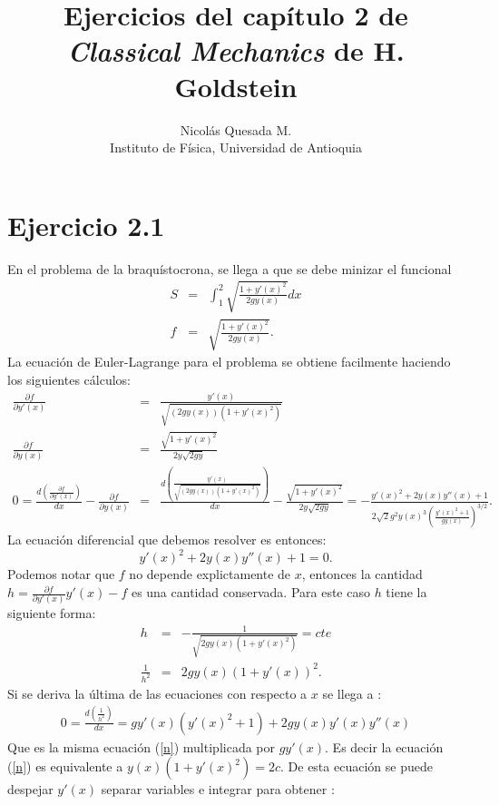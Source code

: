 \documentclass[letterpaper,10pt]{article}
\title{Ejercicios del cap\'itulo 2 de\\ \emph{Classical Mechanics} de H. Goldstein}
\author{Nicol\'as Quesada M. \\ {\small \sf Instituto de F\'isica, Universidad de Antioquia}}
\date{}
\begin{document}
\maketitle
\section*{Ejercicio 2.1}
En el problema de la braqu\'istocrona, se llega a que se debe minizar el funcional
\begin{eqnarray}
\label{integ}
 S&=&\int_1^2 \sqrt{\frac{1+y'(x)^2}{ 2g y(x)}}dx\\
f&=&\sqrt{\frac{1+y'(x)^2}{ 2g y(x)}}.
\end{eqnarray}
La ecuaci\'on de Euler-Lagrange para el problema se obtiene facilmente haciendo los siguientes c\'alculos:
\begin{eqnarray}
\frac{\partial f}{\partial y'(x)}&=&\frac{y'(x)}{\sqrt{(2 g y(x))(1+y'(x)^2)}}\\
\frac{\partial f}{\partial y(x)}&=&\frac{\sqrt{1+y'(x)^2}}{2 y \sqrt{2 g y}}\\
0=\frac{d\left(\frac{\partial f}{\partial y'(x)} \right)}{dx}-\frac{\partial f}{\partial y(x)}&=&\frac{d\left( \frac{y'(x)}{\sqrt{(2 g y(x))(1+y'(x)^2)}}\right)}{dx}-\frac{\sqrt{1+y'(x)^2}}{2 y \sqrt{2 g y}}=-\frac{y'(x)^2+2 y(x) y''(x)+1}{2 \sqrt{2} g^2 y(x)^3
   \left(\frac{y'(x)^2+1}{g y(x)}\right)^{3/2}} .
\end{eqnarray}
La ecuaci\'on diferencial que debemos resolver es entonces:
\begin{equation}
y'(x)^2+2 y(x) y''(x)+1=0.
\label{n}
\end{equation}
Podemos notar que $f$ no depende explictamente de $x$, entonces la cantidad $h=\frac{\partial f}{\partial y'(x)}y'(x)-f$ es una cantidad conservada. Para este caso $h$ tiene la siguiente forma:
\begin{eqnarray}
h&=&-\frac{1}{\sqrt{2 g y(x)(1+y'(x)^2)}}=cte \\
\frac{1}{h^2}&=&2 g y(x) (1+y'(x))^2.
\end{eqnarray}
Si se deriva la \'ultima de las ecuaciones con respecto a $x$ se llega a :
\begin{eqnarray}
0= \frac{d \left(\frac{1}{h^2}\right)}{dx}=g y'(x) \left(y'(x)^2+1\right)+2 g y(x) y'(x) y''(x)
\end{eqnarray}
Que es la misma ecuaci\'on (\ref{n}) multiplicada por $g y'(x)$. Es decir la ecuaci\'on (\ref{n}) es equivalente a $y(x) (1+y'(x)^2)=2c$. De esta ecuaci\'on se puede despejar $y'(x)$ separar variables e integrar para obtener :
\end{document}
